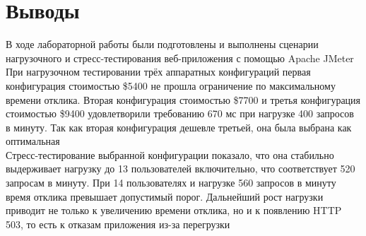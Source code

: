\documentclass[12pt,a4paper]{report}
\begin{document}
\section*{Выводы}
В ходе лабораторной работы были подготовлены и выполнены сценарии нагрузочного и стресс-тестирования веб-приложения с помощью Apache JMeter\\
\hfill\break
При нагрузочном тестировании трёх аппаратных конфигураций первая конфигурация стоимостью \$5400 не прошла ограничение по максимальному времени отклика. Вторая конфигурация стоимостью \$7700 и третья конфигурация стоимостью \$9400 удовлетворили требованию 670 мс при нагрузке 400 запросов в минуту. Так как вторая конфигурация дешевле третьей, она была выбрана как оптимальная\\
\hfill\break
Стресс-тестирование выбранной конфигурации показало, что она стабильно выдерживает нагрузку до 13 пользователей включительно, что соответствует 520 запросам в минуту. При 14 пользователях и нагрузке 560 запросов в минуту время отклика превышает допустимый порог. Дальнейший рост нагрузки приводит не только к увеличению времени отклика, но и к появлению HTTP 503, то есть к отказам приложения из-за перегрузки
\end{document}
